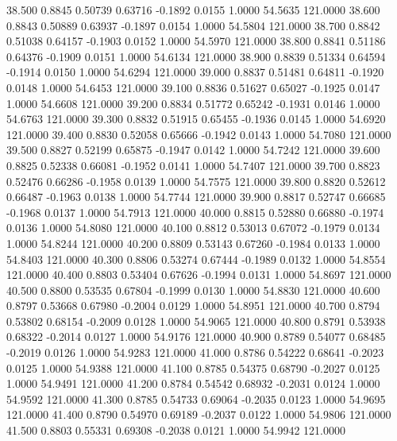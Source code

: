   38.500   0.8845   0.50739   0.63716  -0.1892   0.0155   1.0000  54.5635 121.0000
  38.600   0.8843   0.50889   0.63937  -0.1897   0.0154   1.0000  54.5804 121.0000
  38.700   0.8842   0.51038   0.64157  -0.1903   0.0152   1.0000  54.5970 121.0000
  38.800   0.8841   0.51186   0.64376  -0.1909   0.0151   1.0000  54.6134 121.0000
  38.900   0.8839   0.51334   0.64594  -0.1914   0.0150   1.0000  54.6294 121.0000
  39.000   0.8837   0.51481   0.64811  -0.1920   0.0148   1.0000  54.6453 121.0000
  39.100   0.8836   0.51627   0.65027  -0.1925   0.0147   1.0000  54.6608 121.0000
  39.200   0.8834   0.51772   0.65242  -0.1931   0.0146   1.0000  54.6763 121.0000
  39.300   0.8832   0.51915   0.65455  -0.1936   0.0145   1.0000  54.6920 121.0000
  39.400   0.8830   0.52058   0.65666  -0.1942   0.0143   1.0000  54.7080 121.0000
  39.500   0.8827   0.52199   0.65875  -0.1947   0.0142   1.0000  54.7242 121.0000
  39.600   0.8825   0.52338   0.66081  -0.1952   0.0141   1.0000  54.7407 121.0000
  39.700   0.8823   0.52476   0.66286  -0.1958   0.0139   1.0000  54.7575 121.0000
  39.800   0.8820   0.52612   0.66487  -0.1963   0.0138   1.0000  54.7744 121.0000
  39.900   0.8817   0.52747   0.66685  -0.1968   0.0137   1.0000  54.7913 121.0000
  40.000   0.8815   0.52880   0.66880  -0.1974   0.0136   1.0000  54.8080 121.0000
  40.100   0.8812   0.53013   0.67072  -0.1979   0.0134   1.0000  54.8244 121.0000
  40.200   0.8809   0.53143   0.67260  -0.1984   0.0133   1.0000  54.8403 121.0000
  40.300   0.8806   0.53274   0.67444  -0.1989   0.0132   1.0000  54.8554 121.0000
  40.400   0.8803   0.53404   0.67626  -0.1994   0.0131   1.0000  54.8697 121.0000
  40.500   0.8800   0.53535   0.67804  -0.1999   0.0130   1.0000  54.8830 121.0000
  40.600   0.8797   0.53668   0.67980  -0.2004   0.0129   1.0000  54.8951 121.0000
  40.700   0.8794   0.53802   0.68154  -0.2009   0.0128   1.0000  54.9065 121.0000
  40.800   0.8791   0.53938   0.68322  -0.2014   0.0127   1.0000  54.9176 121.0000
  40.900   0.8789   0.54077   0.68485  -0.2019   0.0126   1.0000  54.9283 121.0000
  41.000   0.8786   0.54222   0.68641  -0.2023   0.0125   1.0000  54.9388 121.0000
  41.100   0.8785   0.54375   0.68790  -0.2027   0.0125   1.0000  54.9491 121.0000
  41.200   0.8784   0.54542   0.68932  -0.2031   0.0124   1.0000  54.9592 121.0000
  41.300   0.8785   0.54733   0.69064  -0.2035   0.0123   1.0000  54.9695 121.0000
  41.400   0.8790   0.54970   0.69189  -0.2037   0.0122   1.0000  54.9806 121.0000
  41.500   0.8803   0.55331   0.69308  -0.2038   0.0121   1.0000  54.9942 121.0000
